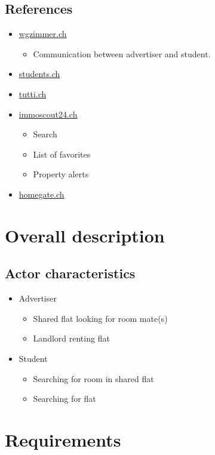 \documentclass[a4paper,11pt]{article}
\begin{document}
\subsection*{References}
\begin{itemize}
  \item \href{www.wgzimmer.ch}{wgzimmer.ch}
  \begin{itemize}
    \item Communication between advertiser and student.
  \end{itemize}
  \item \href{http://www.students.ch/wohnen}{students.ch}
  \item \href{http://www.tutti.ch/ganze-schweiz/immobilien/wg-zimmer}{tutti.ch}
  \item \href{http://www.immoscout24.ch/}{immoscout24.ch}
  \begin{itemize}
    \item Search
    \item List of favorites
    \item Property alerts
  \end{itemize}
  \item \href{http://www.homegate.ch/}{homegate.ch}
\end{itemize}

\section{Overall description}
\subsection*{Actor characteristics}
\begin{itemize}
  \item Advertiser
    \begin{itemize}
      \item Shared flat looking for room mate(s)
      \item Landlord renting flat
    \end{itemize}
  \item Student
  \begin{itemize}
    \item Searching for room in shared flat
    \item Searching for flat
  \end{itemize}
\end{itemize}

\section{Requirements}
\end{document}
